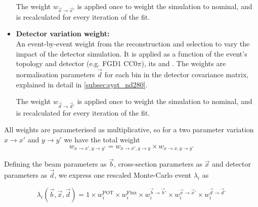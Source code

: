 \begin{itemize}
	The weight $w_{\vec{x}\rightarrow \vec{x}'}$ is applied once to weight the simulation to nominal, and is recalculated for every iteration of the fit.
	
	\item \textbf{Detector variation weight:} \\
	An event-by-event weight from the reconstruction and selection to vary the impact of the detector simulation. It is applied as a function of the event's topology and detector (e.g. FGD1 CC0$\pi$), its \pmu and \cosmu. The weights are normalisation parameters $\vec{d}$ for each bin in the detector covariance matrix, explained in detail in \autoref{subsec:syst_nd280}.
	
	The weight $w_{\vec{d}\rightarrow \vec{d}'}$ is applied once to weight the simulation to nominal, and is recalculated for every iteration of the fit.
\end{itemize}

All weights are parameterised as multiplicative, so for a two parameter variation $x \rightarrow x'$ and $y \rightarrow y'$ we have the total weight 
\begin{equation}
w_{x \rightarrow x', y \rightarrow y'} = w_{x \rightarrow x', y \rightarrow y} \times w_{x \rightarrow x, y\rightarrow y'}
\end{equation}

Defining the beam parameters as $\vec{b}$, cross-section parameters as $\vec{x}$ and detector parameters as $\vec{d}$, we express one rescaled Monte-Carlo event $\lambda_i$ as

\begin{equation}
\lambda_i\left(\vec{b}, \vec{x}, \vec{d}\right) = 1 \times w_i^\text{POT} \times w_i^\text{Flux} \times w^{\vec{b}\rightarrow \vec{b}'}_i \times w^{\vec{x} \rightarrow \vec{x}'}_i \times w^{\vec{d}\rightarrow \vec{d}'}_i
\label{eq:mc_scale}
\end{equation}

